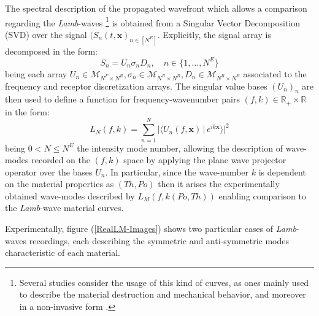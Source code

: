 The spectral description of the propagated wavefront which allows a comparison regarding the \textit{Lamb}-waves \footnote{Several studies consider the usage of this kind of curves, as ones mainly used to describe the material destruction and mechanical behavior, and moreover in a non-invasive form \cite{Rhee2007}.} is obtained from a Singular Vector Decomposition (SVD) over the signal $(S_n(t, \mathbf{x})_{n \in [N^E]}$.
Explicitly, the signal array is decomposed in the form:
\begin{equation*}
    S_n = U_n \sigma_n D_n, \quad n \in \{1,\dots, N^E\}
\end{equation*}
being each array $U_n \in \mathcal{M}_{N^F\times N^R}, \sigma_n \in \mathcal{M}_{N^R\times N^R}, D_n \in \mathcal{M}_{N^R \times N^R}$ associated to the frequency and receptor discretization arrays.
The singular value bases $(U_n)_n$ are then used to define a function for frequency-wavenumber pairs $(f,k) \in \mathbb{R}_+ \times \mathbb{R}$ in the form:
\begin{equation*}
    L_N(f, k) = \sum_{n = 1}^{N} \big \vert \langle U_n(f,\mathbf{x}) \, \vert\, e^{ik\mathbf{x}} \rangle \big \vert^2
\end{equation*}
being $0 < N \leq N^E $ the intensity mode number, allowing the description of wave-modes recorded on the $(f,k)$ space by applying the plane wave projector operator over the bases $U_n$. In particular, since the wave-number $k$ is dependent on the material properties as $(Th, Po)$ then it arises the experimentally obtained wave-modes described by $L_M(f,k(Po, Th))$ enabling comparison to the \textit{Lamb}-wave material curves.

 Experimentally, figure (\ref{RealLM-Images}) shows two particular cases of \textit{Lamb}-waves recordings, each describing the symmetric and anti-symmetric modes characteristic of each material.

